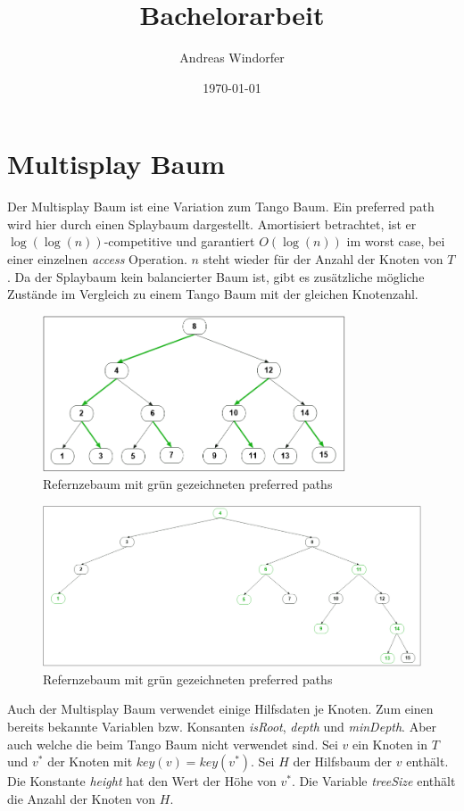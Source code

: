 \documentclass[a4paper,12pt]{article}
\title{Bachelorarbeit}
\author{
	Andreas Windorfer\\
}
\date{\today}
\begin{document}
\maketitle
\newpage

\newpage
\tableofcontents


\newpage


\section{Multisplay Baum}
Der Multisplay Baum ist eine Variation zum Tango Baum. Ein preferred path wird hier durch einen Splaybaum dargestellt. Amortisiert betrachtet, ist er $\log\left(\log\left(n\right)\right)$-competitive und garantiert $O\left(\log \left(n\right)\right)$ im worst case, bei einer einzelnen {\textit{access}} Operation. $n$ steht wieder für der Anzahl der Knoten von $T$. Da der Splaybaum kein balancierter Baum ist, gibt es zusätzliche mögliche Zustände im Vergleich zu einem Tango Baum mit der gleichen Knotenzahl.
\begin{figure}[h]
	\centering
	\includegraphics[width= 0.8\textwidth]{"Medien/Multisplay/referenzTree"}
	\caption {Refernzebaum mit grün gezeichneten preferred paths }
	\label{fig:referenzTree}
\end{figure} 
\begin{figure}[h]
	\centering
	\includegraphics[width= 1\textwidth]{"Medien/Multisplay/pfadRepresentation"}
	\caption {Refernzebaum mit grün gezeichneten preferred paths }
	\label{fig:referenzTree}
\end{figure} 
Auch der Multisplay Baum verwendet einige Hilfsdaten je Knoten. Zum einen bereits bekannte Variablen bzw. Konsanten \textit{isRoot}, \textit{depth} und \textit{minDepth}. Aber auch welche die beim Tango Baum nicht verwendet sind. Sei $v$ ein Knoten in $T$ und $v^*$ der Knoten mit $\mathit{key}\left(v\right) = \mathit{key}\left(v^*\right)$. Sei $H$ der Hilfsbaum der $v$ enthält. Die Konstante \textit{height} hat den Wert der Höhe von $v^*$. Die Variable \textit{treeSize} enthält die Anzahl der Knoten von $H$.   
\end{document}
